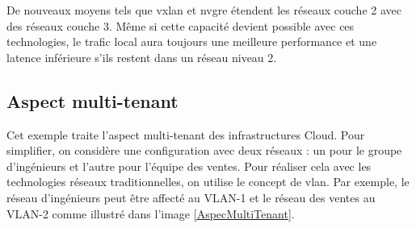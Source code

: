 
De nouveaux moyens tels que  \gls{vxlan} et \gls{nvgre} étendent les réseaux couche 2 avec des réseaux couche 3. Même si cette capacité devient possible avec ces technologies, le trafic local aura toujours une meilleure performance et une latence inférieure s'ils restent dans un réseau niveau 2. 
\cite{hpCloudEffectsOnNetworkChanging} \cite{vm7Challenges} \cite{zkCloudArrived}






\subsection*{Aspect multi-tenant}

Cet exemple traite l'aspect multi-tenant des infrastructures Cloud. Pour simplifier, on considère une configuration avec deux réseaux : un pour le groupe d'ingénieurs et l'autre pour l'équipe des ventes. Pour réaliser cela avec les technologies réseaux traditionnelles, on utilise le concept de \gls{vlan}. Par exemple, le réseau d'ingénieurs peut être affecté au VLAN-1 et le réseau des ventes au VLAN-2 comme illustré dans l'image \ref{AspecMultiTenant}.


